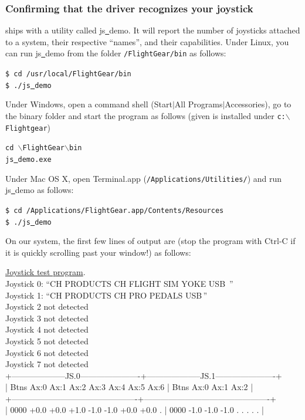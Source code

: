 \subsubsection{Confirming that the driver recognizes your joystick\label{confirming}}
\FlightGear{} ships with a utility called js\underline{~}demo. It will report the number of joysticks attached to a system, their respective ``names'', and their capabilities. Under Linux, you can run js\underline{~}demo from the folder \texttt{/FlightGear/bin} as follows:
\medskip

\noindent
	\texttt{\$ cd /usr/local/FlightGear/bin}\\
	\texttt{\$ ./js\underline{~}demo}
\medskip

\noindent
Under Windows, open a command shell (Start$\left|\right.$All Programs$\left|\right.$Accessories), go to the \FlightGear{} binary folder and start the program as follows (given \FlightGear{} is installed under \texttt{c:$\backslash$Flightgear})
\medskip

\noindent
	\texttt{cd {$\backslash$}FlightGear{$\backslash$}bin}\\
	\texttt{js\underline{~}demo.exe}
\medskip

\noindent
Under Mac OS X, open Terminal.app (\texttt{/Applications/Utilities/}) and run js\underline{~}demo as follows:
\medskip

\noindent
	\texttt{\$ cd /Applications/FlightGear.app/Contents/Resources}\\
	\texttt{\$ ./js\underline{~}demo}
\medskip

On our system, the first few lines of output are (stop the program with Ctrl-C if it is quickly scrolling  past your window!) as follows:
\medskip

\begin{ttfamily}
\tiny
\noindent
\underline{Joystick test program}.\\
Joystick 0: ``CH PRODUCTS CH FLIGHT SIM YOKE USB\, ''\\
Joystick 1: ``CH PRODUCTS CH PRO PEDALS USB\,''\\
Joystick 2 not detected\\
Joystick 3 not detected\\
Joystick 4 not detected\\
Joystick 5 not detected\\
Joystick 6 not detected\\
Joystick 7 not detected\\
+--------------------JS.0----------------------+--------------------JS.1----------------------+\\
| Btns Ax:0 Ax:1 Ax:2 Ax:3 Ax:4 Ax:5 Ax:6      | Btns Ax:0 Ax:1 Ax:2                          |\\
+----------------------------------------------+----------------------------------------------+\\
| 0000 +0.0 +0.0 +1.0 -1.0 -1.0 +0.0 +0.0   .  | 0000 -1.0 -1.0 -1.0   .    .    .    .    .  |\\
\end{ttfamily}

